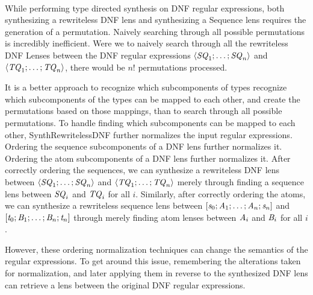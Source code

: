 \documentclass[numbers,10pt,preprint\ifanon ,nocopyrightspace\fi]{sigplanconf}
\begin{document}
\paragraph*{\SynthRWLDNFLens}

While performing type directed synthesis on DNF regular expressions, both
synthesizing a rewriteless DNF lens and synthesizing a Sequence lens requires
the generation of a permutation.  Naively searching through all possible
permutations is incredibly inefficient.  Were we to naively search through all the
rewriteless DNF Lenses between
the DNF regular expressions $\langle\mathit{SQ}_1;\ldots;\mathit{SQ}_n\rangle$ and
$\langle\mathit{TQ}_1;\ldots;\mathit{TQ}_n\rangle$, there would be $n!$ permutations
processed.

It is a better approach to recognize which subcomponents of types 
recognize which subcomponents of the types can be mapped to each other, and
create the permutations based on those mappings, than to
search through all possible permutations.  To handle finding which
subcomponents can be mapped to each other, SynthRewritelessDNF further
normalizes the input regular expressions.
Ordering the sequence subcomponents of a DNF lens further normalizes it.
Ordering the atom subcomponents of a DNF lens further normalizes it.
After correctly ordering the sequences, we can synthesize a rewriteless DNF lens
between $\langle\mathit{SQ}_1;\ldots;\mathit{SQ}_n\rangle$ and
$\langle\mathit{TQ}_1;\ldots;\mathit{TQ}_n\rangle$ merely through finding a sequence
lens between $\mathit{SQ}_i$ and $\mathit{TQ}_i$ for all $i$.  Similarly, after
correctly ordering the atoms, we can
synthesize a rewriteless sequence lens 
between $[\mathit{s}_0;\mathit{A}_1;\ldots;\mathit{A}_n;\mathit{s}_n]$ and
$[\mathit{t}_0;\mathit{B}_1;\ldots;\mathit{B}_n;\mathit{t}_n]$ through
merely finding atom lenses between $\mathit{A}_i$ and $\mathit{B}_i$ for all $i$.

However, these ordering normalization techniques can change the semantics of the
regular
expressions.  To get around this issue, remembering the alterations taken for
normalization, and later applying them in reverse to the synthesized DNF lens
can retrieve a lens between the original DNF regular expressions.
\end{document}
